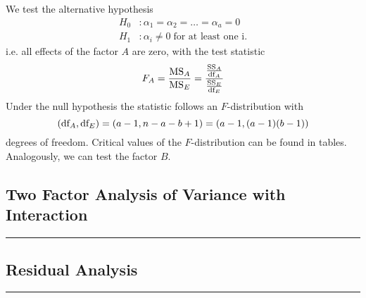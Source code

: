 We test the alternative hypothesis
\begin{equation}
  \begin{split}
    H_0 &: \alpha_1 = \alpha_2 = \dots = \alpha_a = 0\;\\
    H_1 &: \alpha_i \neq 0 \;\text{for at least one i}.
  \end{split}
\end{equation}
i.e. all effects of the factor $A$ are zero, with the test statistic
\begin{equation}
  F_A = \frac{\textup{MS}_A}{\textup{MS}_E} = \frac{\frac{\textup{SS}_A}{\textup{df}_A}}{\frac{\textup{SS}_E}{\textup{df}_E}}
\end{equation}
Under the null hypothesis the statistic follows an $F$-distribution with
\begin{equation}
  \left(\textup{df}_A, \textup{df}_E\right) = (a - 1, n - a - b + 1) = (a - 1,(a - 1)(b - 1))
\end{equation}
degrees of freedom. Critical values of the $F$-distribution can be found in tables. Analogously, we can test the factor $B$.

\subsection{Two Factor Analysis of Variance with Interaction}
\noindent\rule[\linienAbstand]{\linewidth}{\linienDicke}

\subsection{Residual Analysis}
\noindent\rule[\linienAbstand]{\linewidth}{\linienDicke}
